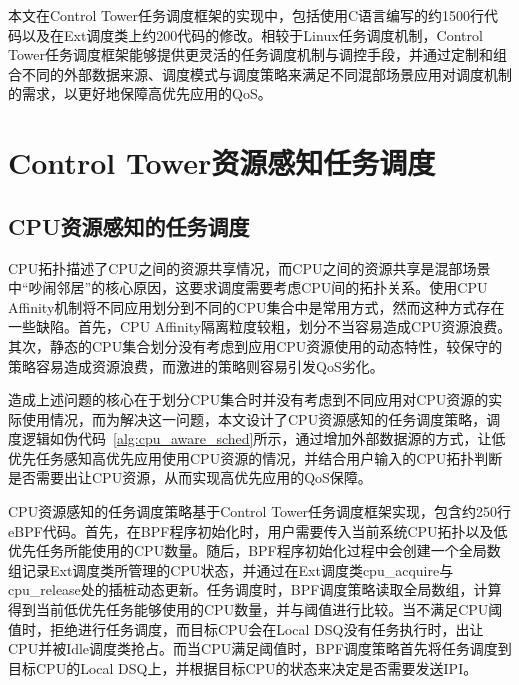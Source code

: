 本文在Control Tower任务调度框架的实现中，包括使用C语言编写的约1500行代码以及在Ext调度类上约200代码的修改。相较于Linux任务调度机制，Control Tower任务调度框架能够提供更灵活的任务调度机制与调控手段，并通过定制和组合不同的外部数据来源、调度模式与调度策略来满足不同混部场景应用对调度机制的需求，以更好地保障高优先应用的QoS。

\section{Control Tower资源感知任务调度}



\subsection{CPU资源感知的任务调度} 


CPU拓扑描述了CPU之间的资源共享情况，而CPU之间的资源共享是混部场景中“吵闹邻居”的核心原因，这要求调度需要考虑CPU间的拓扑关系。使用CPU Affinity机制将不同应用划分到不同的CPU集合中是常用方式，然而这种方式存在一些缺陷。首先，CPU Affinity隔离粒度较粗，划分不当容易造成CPU资源浪费。其次，静态的CPU集合划分没有考虑到应用CPU资源使用的动态特性，较保守的策略容易造成资源浪费，而激进的策略则容易引发QoS劣化。

造成上述问题的核心在于划分CPU集合时并没有考虑到不同应用对CPU资源的实际使用情况，而为解决这一问题，本文设计了CPU资源感知的任务调度策略，调度逻辑如伪代码~\ref{alg:cpu_aware_sched}所示，通过增加外部数据源的方式，让低优先任务感知高优先应用使用CPU资源的情况，并结合用户输入的CPU拓扑判断是否需要出让CPU资源，从而实现高优先应用的QoS保障。

CPU资源感知的任务调度策略基于Control Tower任务调度框架实现，包含约250行eBPF代码。首先，在BPF程序初始化时，用户需要传入当前系统CPU拓扑以及低优先任务所能使用的CPU数量。随后，BPF程序初始化过程中会创建一个全局数组记录Ext调度类所管理的CPU状态，并通过在Ext调度类cpu\_acquire与cpu\_release处的插桩动态更新。任务调度时，BPF调度策略读取全局数组，计算得到当前低优先任务能够使用的CPU数量，并与阈值进行比较。当不满足CPU阈值时，拒绝进行任务调度，而目标CPU会在Local DSQ没有任务执行时，出让CPU并被Idle调度类抢占。而当CPU满足阈值时，BPF调度策略首先将任务调度到目标CPU的Local DSQ上，并根据目标CPU的状态来决定是否需要发送IPI。

